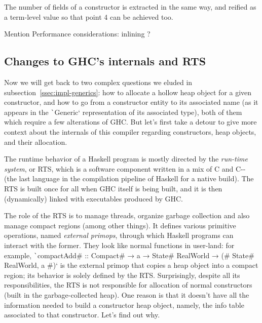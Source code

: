 \documentclass[english]{jflart}
\newcommand{\TODO}[1]{{\color{red}\large #1}}
\begin{document}
The number of fields of a constructor is extracted in the same way, and reified as a term-level value so that point 4 can be achieved too.

\TODO{Mention Performance considerations: inlining ?}

\subsection{Changes to GHC's internals and RTS}\label{ssec:impl-ghc}

Now we will get back to two complex questions we eluded in subsection~\ref{ssec:impl-generics}: how to allocate a hollow heap object for a given constructor, and how to go from a constructor entity to its associated name (as it appears in the \texttt`Generic` representation of its associated type), both of them which require a few alterations of GHC. But let's first take a detour to give more context about the internals of this compiler regarding constructors, heap objects, and their allocation.

The runtime behavior of a Haskell program is mostly directed by the \emph{run-time system}, or RTS, which is a software component written in a mix of C and C-{}- (the last language in the compilation pipeline of Haskell for a native build). The RTS is built once for all when GHC itself is being built, and it is then (dynamically) linked with executables produced by GHC.

The role of the RTS is to manage threads, organize garbage collection and also manage compact regions (among other things). It defines various primitive operations, named \emph{external primops}, through which Haskell programs can interact with the former. They look like normal functions in user-land: for example, \texttt`compactAdd# :: Compact# → a → State# RealWorld → (# State# RealWorld, a #)` is the external primop that copies a heap object into a compact region; its behavior is solely defined by the RTS. Surprisingly, despite all its responsibilities, the RTS is not responsible for allocation of normal constructors (built in the garbage-collected heap). One reason is that it doesn't have all the information needed to build a constructor heap object, namely, the info table associated to that constructor. Let's find out why.
\end{document}
